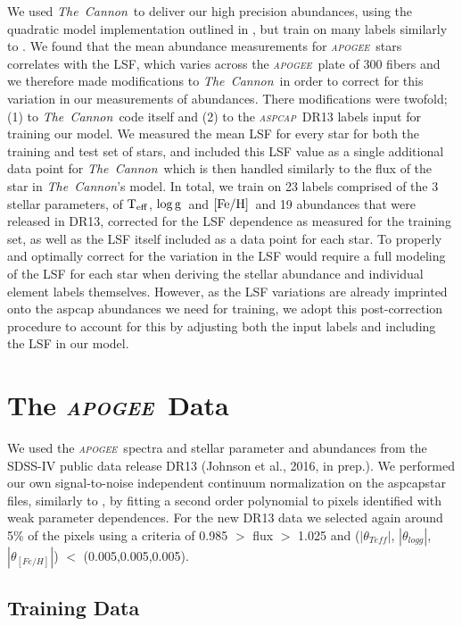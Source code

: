\documentclass[14pt, preprint2]{aastex6}
\newcommand{\project}[1]{\textsl{#1}}
\newcommand{\tc}{\project{The~Cannon}}
\newcommand{\apogee}{\project{\textsc{apogee}}}
\newcommand{\aspcap}{\project{\textsc{aspcap}}}
\newcommand{\teff}{\mbox{$\rm T_{eff}$}}
\newcommand{\feh}{\mbox{$\rm [Fe/H]$}}
\newcommand{\logg}{\mbox{$\rm \log g$}}
\begin{document}
We used \tc\ to deliver our high precision abundances, using the quadratic model implementation outlined in \citet{Ness2015}, but train on many labels similarly to \citet{Casey2016}. We found that the mean abundance measurements for \apogee\ stars correlates with the LSF, which varies across the \apogee\ plate of 300 fibers and we therefore made modifications to \tc\ in order to correct for this variation in our measurements of abundances. There modifications were twofold; (1) to \tc\ code itself and (2) to the \aspcap\ DR13 labels input for training our model.  We measured the mean LSF for every star for both the training and test set of stars, and included this LSF value as a single additional data point for \tc\, which is then handled similarly to the flux of the star in \tc's model. In total, we train on 23 labels comprised of the 3 stellar parameters, of \teff, \logg\ and \feh\ and 19 abundances that were released in DR13, corrected for the LSF dependence as measured for the training set, as well as the LSF itself included as a data point for each star.  To properly and optimally correct for the variation in the LSF would require a full modeling of the LSF for each star when deriving the stellar abundance and individual element labels themselves. However, as the LSF variations are already imprinted onto the aspcap abundances we need for training, we adopt this post-correction procedure to account for this by adjusting both the input labels and including the LSF in our model. %

\section{The \apogee\ Data}

We used the \apogee\ spectra and stellar parameter and abundances from the SDSS-IV public data release DR13 (Johnson et al., 2016, in prep.). We performed our own signal-to-noise independent continuum normalization on the aspcapstar files, similarly to \citet{Ness2015}, by fitting a second order polynomial to pixels identified with weak parameter dependences. For the new DR13 data we selected again around 5\% of the pixels using a criteria of 0.985 $>$ flux $>$ 1.025 and ($|\theta_{Teff}|$, $|\theta_{logg}|$, $|\theta_{[Fe/H]}|$) $<$  (0.005,0.005,0.005). 

\subsection{Training Data} 
\end{document}
